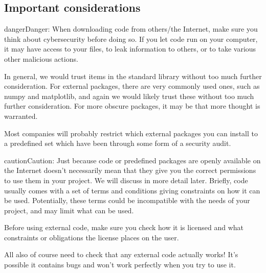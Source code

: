 \documentclass[letterpaper,10pt,british]{sphinxmanual}
\begin{document}
\subsection{Important considerations}
\label{\detokenize{chapters/software_development_tools/libraries:important-considerations}}\label{\detokenize{chapters/software_development_tools/libraries:code-security}}
\begin{sphinxadmonition}{danger}{Danger:}
\sphinxAtStartPar
When downloading code from others/the Internet, make sure you think about cybersecurity before doing so. If you let code run on your computer, it may have access to your files, to leak information to others, or to take various other malicious actions.

\sphinxAtStartPar
In general, we would trust items in the standard library without too much further consideration. For external packages, there are very commonly used ones, such as numpy and matplotlib, and again we would likely trust these without too much further consideration. For more obscure packages, it may be that more thought is warranted.

\sphinxAtStartPar
Most companies will probably restrict which external packages you can install to a pre\sphinxhyphen{}defined set which have been through some form of a security audit.
\end{sphinxadmonition}

\begin{sphinxadmonition}{caution}{Caution:}
\sphinxAtStartPar
Just because code or pre\sphinxhyphen{}defined packages are openly available on the Internet doesn’t necessarily mean that they give you the correct permissions to use them in your project. We will discuss {\hyperref[\detokenize{chapters/software_development_tools/licensing:software-licenses}]{}} in more detail later. Briefly, code usually comes with a set of terms and conditions giving constraints on how it can be used. Potentially, these terms could be incompatible with the needs of your project, and may limit what can be used.

\sphinxAtStartPar
Before using external code, make sure you check how it is licensed and what constraints or obligations the license places on the user.

\sphinxAtStartPar
All also of course need to check that any external code actually works! It’s possible it contains bugs and won’t work perfectly when you try to use it.
\end{sphinxadmonition}
\end{document}
